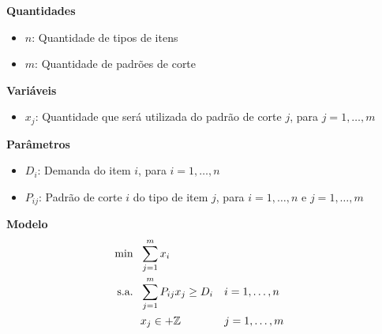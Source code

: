 \documentclass[12pt]{article}
\begin{document}
\textbf{Quantidades}
\begin{itemize}
    \item $n$: Quantidade de tipos de itens
    \item $m$: Quantidade de padrões de corte
\end{itemize}

\textbf{Variáveis}
\begin{itemize}
    \item $x_j$: Quantidade que será utilizada do padrão de corte $j$, para $j = 1,\ldots, m$
\end{itemize}

\textbf{Parâmetros}
\begin{itemize}
    \item $D_i$: Demanda do item $i$, para $i = 1,\ldots, n$
    \item $P_{ij}$: Padrão de corte $i$ do tipo de item $j$, para $i = 1,\ldots, n$ e $j = 1,\ldots, m$
\end{itemize}

\textbf{Modelo}
\begin{align*}
    \hbox{min} \ \ 
        & \sum_{j=1}^m x_i \\
    \hbox{s.a.} \ \ 
        & \sum_{j=1}^m P_{ij} x_j \geq D_i && i = 1,\ldots, n \\
        & x_{j} \in +\mathbb{Z}            && j = 1,\ldots, m \\
\end{align*}
\end{document}
